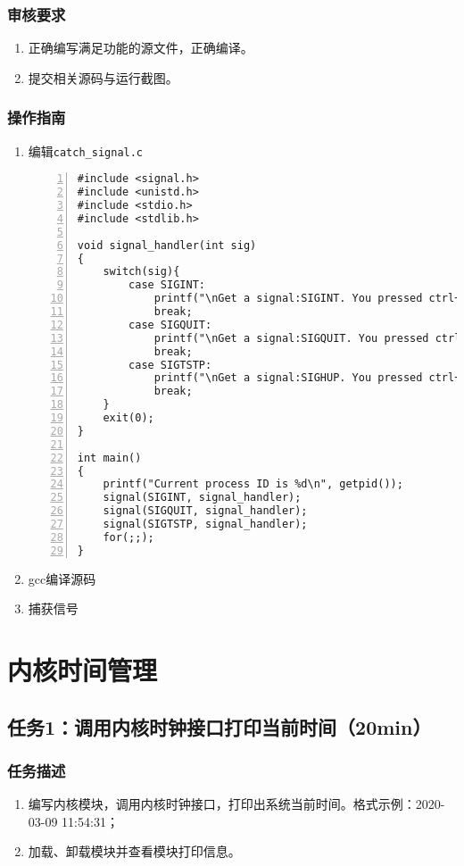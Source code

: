 \documentclass{article}
\begin{document}
\subsubsection{审核要求}
\begin{enumerate}
    \item 正确编写满足功能的源文件，正确编译。
    \item 提交相关源码与运行截图。
\end{enumerate}

\subsubsection{操作指南}
\newpage
\begin{enumerate}
	\item 编辑\verb|catch_signal.c|
\begin{lstlisting}[numbers=left]
#include <signal.h>
#include <unistd.h>
#include <stdio.h>
#include <stdlib.h>

void signal_handler(int sig)
{
	switch(sig){
		case SIGINT:
			printf("\nGet a signal:SIGINT. You pressed ctrl+c.\n");
			break;
		case SIGQUIT:
			printf("\nGet a signal:SIGQUIT. You pressed ctrl+\\.\n");
			break;
		case SIGTSTP:
			printf("\nGet a signal:SIGHUP. You pressed ctrl+z.\n");
			break;
	}
	exit(0);
}

int main()
{
	printf("Current process ID is %d\n", getpid());
	signal(SIGINT, signal_handler);
	signal(SIGQUIT, signal_handler);
	signal(SIGTSTP, signal_handler);
	for(;;);
}

\end{lstlisting}
    \item gcc编译源码
    \item 捕获信号
\end{enumerate}

\newpage


\section{内核时间管理}
\subsection{任务1：调用内核时钟接口打印当前时间（20min）}

\subsubsection{任务描述}
\begin{enumerate}
    \item 编写内核模块，调用内核时钟接口，打印出系统当前时间。格式示例：2020-03-09 11:54:31；
    \item 加载、卸载模块并查看模块打印信息。
\end{enumerate}
\end{document}
